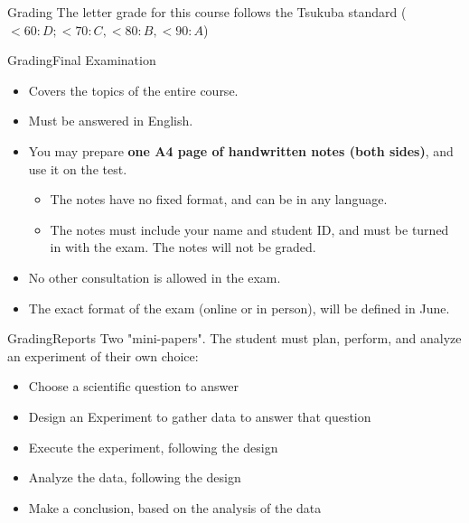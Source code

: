 \documentclass[aspectratio=169]{beamer}
\begin{document}
\begin{CJK}{UTF8}{ipxm}
\begin{frame}{Grading}
  The letter grade for this course follows the Tsukuba standard ($< 60: D; < 70: C, < 80: B, < 90: A$)
\end{frame}

\begin{frame}{Grading}{Final Examination}
  \begin{itemize}
    \item Covers the topics of the entire course.
    \item Must be answered in English.
    \item You may prepare {\bf one A4 page of handwritten notes (both sides)}, and use it on the test.
    \begin{itemize}
      \item The notes have no fixed format, and can be in any language.
      \item The notes must include your name and student ID, and must be turned in with the exam. The notes will not be graded.
    \end{itemize}
    \item No other consultation is allowed in the exam.
    \item The exact format of the exam (online or in person), will be defined in June.
  \end{itemize}
\end{frame}

\begin{frame}{Grading}{Reports}
  Two "mini-papers". The student must plan, perform, and analyze an experiment of their own choice:\bigskip

  \begin{itemize}
    \item Choose a scientific question to answer
    \item Design an Experiment to gather data to answer that question
    \item Execute the experiment, following the design
    \item Analyze the data, following the design
    \item Make a conclusion, based on the analysis of the data
  \end{itemize}
\end{frame}


\end{CJK}
\end{document}

